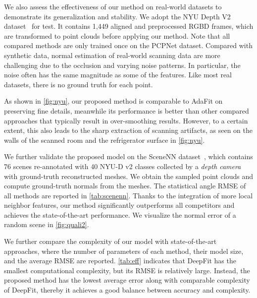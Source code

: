 \documentclass[runningheads]{llncs}
\begin{document}
 We also assess the effectiveness of our method on real-world datasets to demonstrate its generalization and stability. We adopt the NYU Depth V2 dataset~\cite{silberman2012indoor} for test. It contains 1,449 aligned and preprocessed RGBD frames, which are transformed to  point clouds before applying our method. Note that all compared methods are only trained once on the PCPNet dataset. Compared with synthetic data, normal estimation of real-world scanning data are more challenging due to the occlusion and varying noise patterns. In particular, the noise often has the same magnitude as some of the features. Like most real datasets, there is no ground truth for each point. 

As shown in \cref{fig:nyu}, our proposed method is comparable to AdaFit on preserving fine details, meanwhile its performance is better than other compared approaches that typically result in over-smoothing results. However, to a certain extent, this also leads to the sharp extraction of scanning artifacts, as seen on the walls of the scanned room and the refrigerator surface in \cref{fig:nyu}. 



We further validate the proposed model on the SceneNN dataset~\cite{hua-pointwise-cvpr18}, which contains 76 scenes re-annotated with 40 NYU-D v2 classes collected by a \emph{depth camera} with ground-truth reconstructed meshes. We obtain the sampled point clouds and compute ground-truth normals from the meshes. The statistical angle RMSE of all methods are reported in \cref{tab:scenenn}. 
Thanks to the integration of more local neighbor features, our method significantly outperforms all competitors and achieves the state-of-the-art performance. We visualize the normal error of a random scene in \cref{fig:quali2}.





 We further compare the complexity of our model with state-of-the-art approaches, where the number of parameters of each method, their model size, and the average RMSE are reported. \cref{tab:eff} indicates that 
DeepFit has the smallest computational complexity, but its RMSE is relatively large. Instead, the proposed method has the lowest average error along with comparable complexity of DeepFit, thereby it achieves a good balance between accuracy and complexity.
\end{document}
